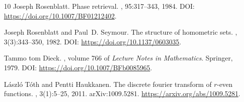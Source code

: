\documentclass[11pt]{article}
\numberwithin{equation}{section}
\theoremstyle{definition}
\theoremstyle{remark}
\begin{document}
\begin{thebibliography}{10}
Joseph Rosenblatt.
\newblock Phase retrieval.
, 95:317--343, 1984.
\newblock DOI: \url{https://doi.org/10.1007/BF01212402}.

Joseph Rosenblatt and Paul~D. Seymour.
\newblock The structure of homometric sets.
, 3(3):343--350,
  1982.
\newblock DOI: \url{https://doi.org/10.1137/0603035}.

Tammo tom Dieck.
, volume 766 of
  {\em Lecture Notes in Mathematics}.
\newblock Springer, 1979.
\newblock DOI: \url{https://doi.org/10.1007/BFb0085965}.

L{\'a}szl{\'o} T{\'o}th and Pentti Haukkanen.
\newblock The discrete fourier transform of {$r$}-even functions.
, 3(1):5--25, 2011.
\newblock arXiv:1009.5281. \url{https://arxiv.org/abs/1009.5281}.

\end{thebibliography}

\endgroup
\end{document}
